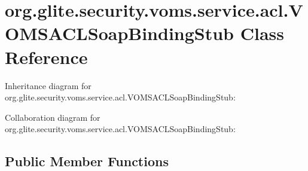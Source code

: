 \hypertarget{classorg_1_1glite_1_1security_1_1voms_1_1service_1_1acl_1_1VOMSACLSoapBindingStub}{
\section{org.glite.security.voms.service.acl.VOMSACLSoapBindingStub Class Reference}
\label{classorg_1_1glite_1_1security_1_1voms_1_1service_1_1acl_1_1VOMSACLSoapBindingStub}
}


Inheritance diagram for org.glite.security.voms.service.acl.VOMSACLSoapBindingStub:


Collaboration diagram for org.glite.security.voms.service.acl.VOMSACLSoapBindingStub:
\subsection*{Public Member Functions}

